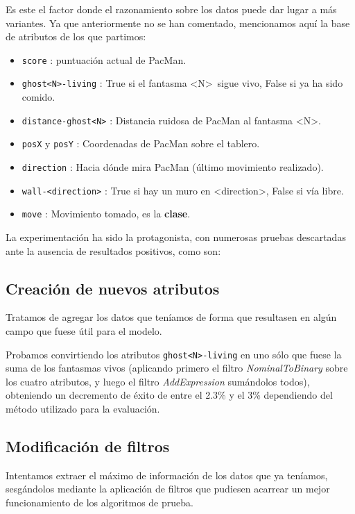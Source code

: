 \documentclass[12pt]{article}
\begin{document}
Es este el factor donde el razonamiento sobre los datos puede dar lugar a más variantes. Ya que anteriormente no se han comentado, mencionamos aquí la base de atributos de los que partimos:
\begin{itemize}
    \item \texttt{score} : puntuación actual de PacMan.
    \item \texttt{ghost<N>-living} : True si el fantasma \textless N\textgreater\ sigue vivo, False si ya ha sido comido.
    \item \texttt{distance-ghost<N>} : Distancia ruidosa de PacMan al fantasma \textless N\textgreater.
    \item \texttt{posX} y \texttt{posY} : Coordenadas de PacMan sobre el tablero.
    \item \texttt{direction} : Hacia dónde mira PacMan (último movimiento realizado).
    \item \texttt{wall-<direction>} : True si hay un muro en \textless direction\textgreater, False si vía libre.
    \item \texttt{move} : Movimiento tomado, es la \textbf{clase}.
\end{itemize}

La experimentación ha sido la protagonista, con numerosas pruebas descartadas ante la ausencia de resultados positivos, como son:

\subsection{Creación de nuevos atributos}

Tratamos de agregar los datos que teníamos de forma que resultasen en algún campo que fuese útil para el modelo.

Probamos convirtiendo los atributos \texttt{ghost<N>-living} en uno sólo que fuese la suma de los fantasmas vivos (aplicando primero el filtro \emph{NominalToBinary} sobre los cuatro atributos, y luego el filtro \emph{AddExpression} sumándolos todos), obteniendo un decremento de éxito de entre el 2.3\% y el 3\% dependiendo del método utilizado para la evaluación.

\subsection{Modificación de filtros}

Intentamos extraer el máximo de información de los datos que ya teníamos, sesgándolos mediante la aplicación de filtros que pudiesen acarrear un mejor funcionamiento de los algoritmos de prueba.
\end{document}
